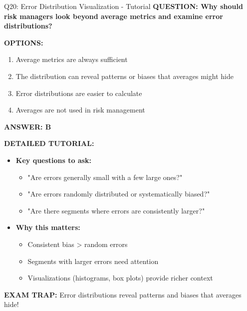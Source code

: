 \documentclass[8pt]{beamer}
\begin{document}
	\begin{frame}{Q20: Error Distribution Visualization - Tutorial}
		\fontsize{6.5}{7.5}\selectfont
		\textbf{QUESTION: Why should risk managers look beyond average metrics and examine error distributions?}
		
		\vspace{0.1cm}
		\textbf{OPTIONS:}
		\begin{enumerate}
			\item Average metrics are always sufficient
			\item The distribution can reveal patterns or biases that averages might hide
			\item Error distributions are easier to calculate
			\item Averages are not used in risk management
		\end{enumerate}
		
		\vspace{0.1cm}
		\textcolor{myblue}{\textbf{ANSWER: B}}
		
		\vspace{0.1cm}
		\textbf{DETAILED TUTORIAL:}
		\begin{itemize}
			\item \textbf{Key questions to ask:}
			\begin{itemize}
				\item "Are errors generally small with a few large ones?"
				\item "Are errors randomly distributed or systematically biased?"
				\item "Are there segments where errors are consistently larger?"
			\end{itemize}
			\item \textbf{Why this matters:}
			\begin{itemize}
				\item Consistent bias > random errors
				\item Segments with larger errors need attention
				\item Visualizations (histograms, box plots) provide richer context
			\end{itemize}
		\end{itemize}
		
		\textcolor{myred}{\textbf{EXAM TRAP:}} Error distributions reveal \textcolor{myblue}{patterns and biases} that averages hide!
	\end{frame}
	
\end{document}
